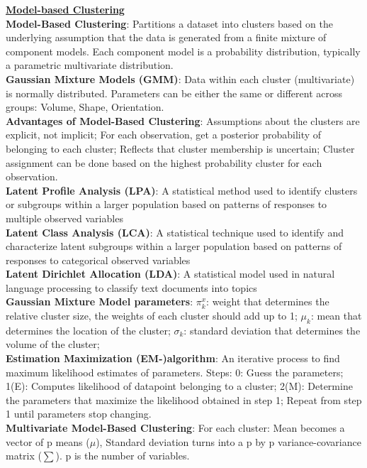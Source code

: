 \documentclass[a4paper,7pt,landscape]{extarticle}
\begin{document}
\begin{multicols}{3}
\begin{boxA}
\underline{\textbf{Model-based Clustering}}\\
\textbf{Model-Based Clustering}: Partitions a dataset into clusters based on the underlying assumption that the data is generated from a finite mixture of component models. Each component model is a probability distribution, typically a parametric multivariate distribution.\\
\textbf{Gaussian Mixture Models (GMM)}: Data within each cluster (multivariate) is normally distributed. Parameters can be either the same or different across groups: Volume, Shape, Orientation.\\
\textbf{Advantages of Model-Based Clustering}: Assumptions about the clusters are explicit, not implicit; For each observation, get a posterior probability of belonging to each cluster; Reflects that cluster membership is uncertain; Cluster assignment can be done based on the highest probability cluster for each observation.\\
\textbf{Latent Profile Analysis (LPA)}: A statistical method used to identify clusters or subgroups within a larger population based on patterns of responses to multiple observed variables\\
\textbf{Latent Class Analysis (LCA)}: A statistical technique used to identify and characterize latent subgroups within a larger population based on patterns of responses to categorical observed variables\\
\textbf{Latent Dirichlet Allocation (LDA)}: A statistical model used in natural language processing to classify text documents into topics\\
\textbf{Gaussian Mixture Model parameters}: $\pi_k^x$: weight that determines the relative cluster size, the weights of each cluster should add up to 1; $\mu_k$: mean that determines the location of the cluster; $\sigma_k$: standard deviation that determines the volume of the cluster;\\
\textbf{Estimation Maximization (EM-)algorithm}: An iterative process to find maximum likelihood estimates of parameters. Steps: 0: Guess the parameters; 1(E): Computes likelihood of datapoint belonging to a cluster; 2(M): Determine the parameters that maximize the likelihood obtained in step 1; Repeat from step 1 until parameters stop changing.\\
\textbf{Multivariate Model-Based Clustering}: For each cluster: Mean becomes a vector of p means ($\mu$), Standard deviation turns into a p by p variance-covariance matrix ($\sum$). p is the number of variables.\\

\end{boxA}
\end{multicols}
\end{document}
